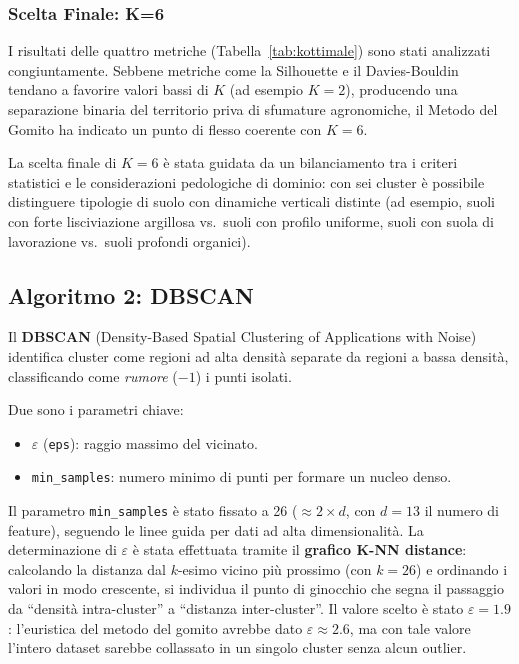 \documentclass[a4paper,12pt]{article}
\newcommand{\kval}[1]{$K{=}#1$}
\begin{document}
\subsubsection{Scelta Finale: K=6}

I risultati delle quattro metriche (Tabella~\ref{tab:kottimale}) sono
stati analizzati congiuntamente. Sebbene metriche come la Silhouette e
il Davies-Bouldin tendano a favorire valori bassi di $K$ (ad esempio
$K=2$), producendo una separazione binaria del territorio priva di
sfumature agronomiche, il Metodo del Gomito ha indicato un punto di
flesso coerente con $K=6$.

La scelta finale di \kval{6} è stata guidata da un bilanciamento tra
i criteri statistici e le considerazioni pedologiche di dominio:
con sei cluster è possibile distinguere tipologie di suolo con
dinamiche verticali distinte (ad esempio, suoli con forte lisciviazione
argillosa vs.\ suoli con profilo uniforme, suoli con suola di
lavorazione vs.\ suoli profondi organici).

\subsection{Algoritmo 2: DBSCAN}

Il \textbf{DBSCAN} (Density-Based Spatial Clustering of Applications
with Noise) identifica cluster come regioni ad alta densità separate da
regioni a bassa densità, classificando come \emph{rumore} ($-1$) i
punti isolati.

Due sono i parametri chiave:
\begin{itemize}
    \item $\varepsilon$ (\texttt{eps}): raggio massimo del vicinato.
    \item \texttt{min\_samples}: numero minimo di punti per formare un
    nucleo denso.
\end{itemize}

Il parametro \texttt{min\_samples} è stato fissato a 26
($\approx 2 \times d$, con $d = 13$ il numero di feature), seguendo
le linee guida per dati ad alta dimensionalità. La determinazione di
$\varepsilon$ è stata effettuata tramite il \textbf{grafico K-NN
distance}: calcolando la distanza dal $k$-esimo vicino più prossimo
(con $k = 26$) e ordinando i valori in modo crescente, si individua
il punto di ginocchio che segna il passaggio da ``densità
intra-cluster'' a ``distanza inter-cluster''. Il valore scelto è stato
$\varepsilon = 1.9$: l'euristica del metodo del gomito avrebbe dato $\varepsilon \approx 2.6$, ma con tale valore l'intero dataset sarebbe collassato in un singolo cluster senza alcun outlier. 
\end{document}
